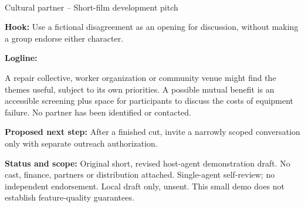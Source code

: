 \documentclass[11pt,letterpaper]{article}
\begin{document}
\begin{center}
{\Large\bfseries\sffamily \filmtitleupper}\\[6pt]
Cultural partner -- Short-film development pitch
\end{center}
\textbf{Hook:} Use a fictional disagreement as an opening for discussion, without making a group endorse either character.

\textbf{Logline:} \filmlogline

A repair collective, worker organization or community venue might find the themes useful, subject to its own priorities. A possible mutual benefit is an accessible screening plus space for participants to discuss the costs of equipment failure. No partner has been identified or contacted.

\textbf{Proposed next step:} After a finished cut, invite a narrowly scoped conversation only with separate outreach authorization.

\textbf{Status and scope:} Original short, revised host-agent demonstration draft. No cast, finance, partners or distribution attached. Single-agent self-review; no independent endorsement. Local draft only, unsent. This small demo does not establish feature-quality guarantees.
\end{document}
